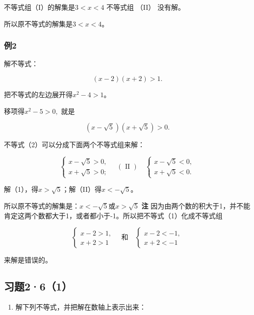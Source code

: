 不等式组（I）的解集是\(3 < x < 4\) 不等式组 （II） 没有解。

所以原不等式的解集是\(3 < x < 4\)。

\subsubsection{例2}

解不等式：

\[
(x - 2) (x + 2) > 1. \tag {1}
\]

 把不等式的左边展开得\(x^{2}-4>1\)。

移项得\(x^{2} - 5 > 0,\) 就是

\[
(x - \sqrt{5}) (x + \sqrt{5}) > 0. \tag {2}
\]

不等式（2）可以分成下面两个不等式组来解：

\[
\left\{ \begin{array}{ll} x - \sqrt{5} > 0, \\ x + \sqrt{5} > 0; \end{array} \right. \quad (\text{ II }) \quad \left\{ \begin{array}{ll} x - \sqrt{5} < 0, \\ x + \sqrt{5} < 0. \end{array} \right. \tag {I}
\]

解（1），得\(x > \sqrt{5}\)；解（II）得\(x < -\sqrt{5}\)。

所以原不等式的解集是：\(x < -\sqrt{5}\)或\(x > \sqrt{5}\) \textbf{注}
因为由两个数的积大于1，并不能肯定这两个数都大于1，或者都小于-1。所以把不等式（1）化成不等式组

\[
\left\{ \begin{array}{ll} x - 2 > 1, \\ x + 2 > 1 \end{array} \right. \quad \text{和} \quad \left\{ \begin{array}{ll} x - 2 < - 1, \\ x + 2 < - 1 \end{array} \right.
\]

来解是错误的。

\subsection{习题2·6（1）}

\begin{enumerate}
\item
  解下列不等式，并把解在数轴上表示出来：
\end{enumerate}

